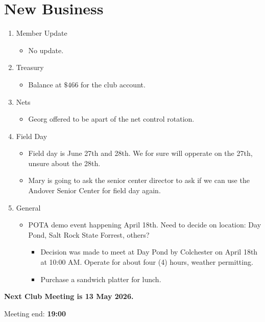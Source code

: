 \documentclass[12pt, letterpaper]{article}
\begin{document}
\section{New Business}
    \begin{enumerate}
    \item Member Update
        \begin{itemize}
            \item  No update.
        \end{itemize}
    \item Treasury
        \begin{itemize}
            \item Balance at $\mathdollar 466$ for the club account.
        \end{itemize}
    \item Nets
        \begin{itemize}
            \item Georg offered to be apart of the net control rotation.
        \end{itemize}
    \item Field Day
        \begin{itemize}
            \item Field day is June 27th and 28th. We for sure will opperate on the 27th, unsure about the 28th.
            \item Mary is going to ask the senior center director to ask if we can use the Andover Senior Center for field day again. 
        \end{itemize}
    \item General
        \begin{itemize}
            \item POTA demo event happening April 18th. Need to decide on location: Day Pond, Salt Rock State Forrest, others?
                \begin{itemize}
                    \item Decision was made to meet at Day Pond by Colchester on April 18th at 10:00 AM. Operate for about four (4) hours, weather permitting.
                    \item Purchase a sandwich platter for lunch.
                \end{itemize}
        \end{itemize}
    \end{enumerate}

    \textbf{\Large{Next Club Meeting is 13 May 2026.}}

    Meeting end: \textbf{19:00}
\end{document}
